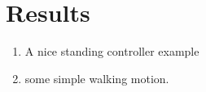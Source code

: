 

\section{Results}
\label{sec:results}

\begin{enumerate}
	\item A nice standing controller example
	\item some simple walking motion.
\end{enumerate}
